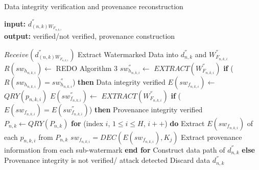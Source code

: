 \documentclass{llncs}
\begin{document}
\begin{enumerate}
    
    \begin{algorithm}[!htbp]
    \caption{Data integrity verification and provenance reconstruction}\label{alg5}
    \hspace*{\algorithmicindent} \textbf{input:} $d^{''}_{(n,k)W_{F_{n,k,i}}}$ \\
    \hspace*{\algorithmicindent} \textbf{output:} verified/not verified, provenance construction
    \begin{algorithmic}[1]
    \State $Receive(d^{''}_{(n,k)W_{F_{n,k,i}}})$
    \State Extract Watermarked Data into $d^{''}_{n,k}$ and $W^{''}_{F_{n,k,i}}$
    \State $R(sw_{h_{n,k,i}}) \gets $ REDO Algorithm 3 
    \State $sw^{''}_{h_{n,k,i}} \gets $ $EXTRACT(W^{''}_{F_{n,k,i}})$
    \State \textbf{if} ($R(sw_{h_{n,k,i}})  =  sw^{''}_{h_{n,k,i}}$) \textbf{then}
    \State \hspace{10pt} Data integrity verified
    \State \hspace{10pt} $E(sw_{f_{n,k,i}}) \gets $ $QRY(p_{n,k,i})$ 
    \State \hspace{10pt} $E(sw^{''}_{f_{n,k,i}}) \gets $ $EXTRACT(W^{''}_{F_{n,k,i}})$
    \State \hspace{10pt} \textbf{if} ($E(sw_{f_{n,k,i}})  =  E(sw^{''}_{f_{n,k,i}})$) \textbf{then}
    \State \hspace{20pt} Provenance integrity verified
    \State \hspace{20pt} $P_{n,k} \gets QRY(P_{n,k})$  
    \State \hspace{20pt} \textbf{for} (index $i$, $1 \le i \le H$, $i++$) \textbf{do}
    \State \hspace{30pt} Extract $E(sw_{f_{n,k,i}})$ of each $p_{n,k,i}$ from $P_{n,k}$
    \State \hspace{30pt} $sw_{f_{n,k,i}} = DEC(E(sw_{f_{n,k,i}}),K_j)$ 
    \State \hspace{30pt} Extract provenance information from each sub-watermark
    \State \hspace{20pt} \textbf{end for}
    \State \hspace{20pt} Construct data path of $d^{''}_{n,k}$
    \State \hspace{10pt} \textbf{else} 
    \State \hspace{20pt} Provenance integrity is not verified/ attack detected
    \State \hspace{20pt} Discard data $d^{''}_{n,k}$

\end{algorithmic}
\end{algorithm}
\end{enumerate}
\end{document}
